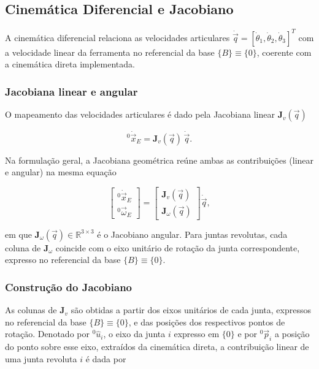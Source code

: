 \subsection{Cinemática Diferencial e Jacobiano}
\label{sec:cinematica_diferencial_jacobiano}

A cinemática diferencial relaciona as velocidades articulares
$\dot{\vec q} = [\dot\theta_1,\dot\theta_2,\dot\theta_3]^T$
com a velocidade linear da ferramenta no referencial da base $\{B\}\equiv\{0\}$, coerente com a cinemática direta implementada.

\subsubsection{Jacobiana linear e angular}
O mapeamento das velocidades articulares é dado pela Jacobiana linear $\mathbf{J}_{v}(\vec q)$

\begin{equation}
\label{eq:jacob_linear1}
{}^{0}\!\dot{\vec{x}}_{E} = \mathbf{J}_{v}(\vec q)\,\dot{\vec q}.
\end{equation}

Na formulação geral, a Jacobiana geométrica reúne ambas as contribuições (linear e angular) na mesma equação

\begin{equation}
\begin{bmatrix}
{}^{0}\!\dot{\vec{x}}_{E} \\
{}^{0}\!\vec{\omega}_{E}
\end{bmatrix}
=
\begin{bmatrix}
\mathbf{J}_{v}(\vec q) \\
\mathbf{J}_{\omega}(\vec q)
\end{bmatrix}
\dot{\vec q}, 
\end{equation}

em que $\mathbf{J}_{\omega}(\vec q)\in\mathbb{R}^{3\times 3}$ é o Jacobiano angular.
Para juntas revolutas, cada coluna de $\mathbf{J}_{\omega}$ coincide com o eixo unitário de rotação da junta correspondente, expresso no referencial da base $\{B\}\equiv\{0\}$.

\subsubsection{Construção do Jacobiano}

As colunas de $\mathbf{J}_{v}$ são obtidas a partir dos eixos unitários de cada junta, expressos no referencial da base $\{B\}\equiv\{0\}$, e das posições dos respectivos pontos de rotação.
Denotado por ${}^{0}\!\hat{u}_{i}$, o eixo da junta $i$ expresso em $\{0\}$ e por ${}^{0}\!\vec p_{i}$ a posição do ponto sobre esse eixo, extraídos da cinemática direta, a contribuição linear de uma junta revoluta $i$ é dada por

